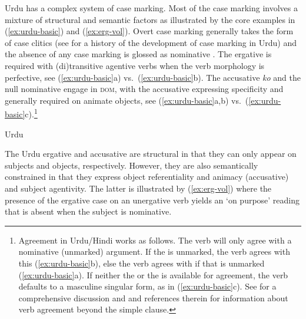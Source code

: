 \documentclass[output=paper,hidelinks]{langscibook}
\begin{document}
Urdu has a complex system of case marking.  Most of the case marking involves a
mixture of structural and semantic factors as illustrated by the core examples
in (\ref{ex:urdu-basic}) and (\ref{ex:erg-vol}).  Overt case marking  generally
takes the form of case clitics (see \citet{buttahmed11} for a history of the
development of case marking in Urdu) and the absence of any case marking is glossed as
nominative \citep{MohananT1994}.   The ergative is required with (di)transitive
agentive verbs when the verb morphology is perfective, see (\ref{ex:urdu-basic}a)
vs.~(\ref{ex:urdu-basic}b). The accusative {\em ko} and the null nominative engage in
\textsc{dom}, with the accusative expressing specificity \citep{butt93}
and generally required on animate
objects, see (\ref{ex:urdu-basic}a,b)
vs.~(\ref{ex:urdu-basic}c).\footnote{Agreement in Urdu/Hindi works as follows. 
  The verb will only agree with a nominative (unmarked) argument.  If the \SUBJ
  is unmarked, the verb agrees with this (\ref{ex:urdu-basic}b), else the verb agrees with \OBJ if that
  is unmarked (\ref{ex:urdu-basic}a).  If neither the \SUBJ or the \OBJ is available for agreement,
  the verb defaults to a masculine singular form, as in
  (\ref{ex:urdu-basic}c). See \citet{MohananT1994} for a comprehensive discussion
and \citet{Butt2014} and references therein for information about verb agreement beyond
the simple clause.}
\clearpage

\begin{exe}
  \ex \label{ex:urdu-basic}
Urdu
  \begin{xlist}




\end{xlist}
\end{exe}
The Urdu ergative and accusative are structural in that they can only appear on
subjects and objects, respectively.  However, they are also semantically
constrained in that they express object
referentiality and animacy (accusative) and subject agentivity. The latter is illustrated by
(\ref{ex:erg-vol}) where the presence of the ergative case on an unergative verb
yields an
`on purpose' reading that is absent when the subject is nominative. 
\end{document}

